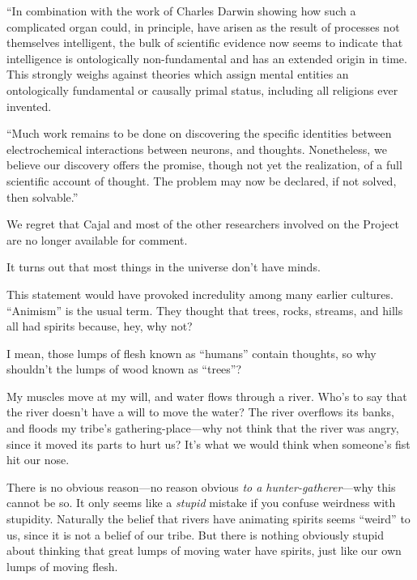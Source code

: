 {
 ``In combination with the work of Charles Darwin
showing how such a complicated organ could, in principle, have arisen
as the result of processes not themselves intelligent, the bulk of
scientific evidence now seems to indicate that intelligence is
ontologically non-fundamental and has an extended origin in time. This
strongly weighs against theories which assign mental entities an
ontologically fundamental or causally primal status, including all
religions ever invented.}

{
 ``Much work remains to be done on discovering the
specific identities between electrochemical interactions between
neurons, and thoughts. Nonetheless, we believe our discovery offers the
promise, though not yet the realization, of a full scientific account
of thought. The problem may now be declared, if not solved, then
solvable.''}

{
 We regret that Cajal and most of the other researchers involved on
the Project are no longer available for comment.}

\myendsectiontext


{
 It turns out that most things in the universe
don't have minds. }

{
 This statement would have provoked incredulity among many earlier
cultures. ``Animism'' is the usual
term. They thought that trees, rocks, streams, and hills all had
spirits because, hey, why not?}

{
 I mean, those lumps of flesh known as
``humans'' contain thoughts, so why
shouldn't the lumps of wood known as
``trees''?}

{
 My muscles move at my will, and water flows through a river.
Who's to say that the river doesn't
have a will to move the water? The river overflows its banks, and
floods my tribe's gathering-place---why not think that
the river was angry, since it moved its parts to hurt us?
It's what we would think when someone's
fist hit our nose.}

{
 There is no obvious reason---no reason obvious \textit{to a
hunter-gatherer}{}---why this cannot be so. It only seems like a
\textit{stupid} mistake if you confuse weirdness with stupidity.
Naturally the belief that rivers have animating spirits seems
``weird'' to us, since it is not a
belief of our tribe. But there is nothing obviously stupid about
thinking that great lumps of moving water have spirits, just like our
own lumps of moving flesh.}

